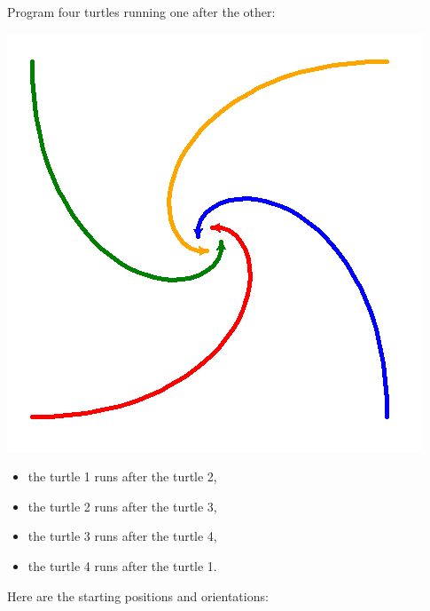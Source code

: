 \documentclass[11pt,class=report,crop=false]{standalone}
\begin{document}
\begin{activite}


Program four turtles running one after the other:

\begin{center}
\includegraphics[scale=\myscale,scale=0.5]{screen-turtle-6a}
\end{center}


\begin{itemize}
  \item the turtle 1 runs after the turtle 2,
  \item the turtle 2 runs after the turtle 3,
  \item the turtle 3 runs after the turtle 4,
  \item the turtle 4 runs after the turtle 1.
\end{itemize}

\bigskip

Here are the starting positions and orientations:



\end{activite}
\end{document}
